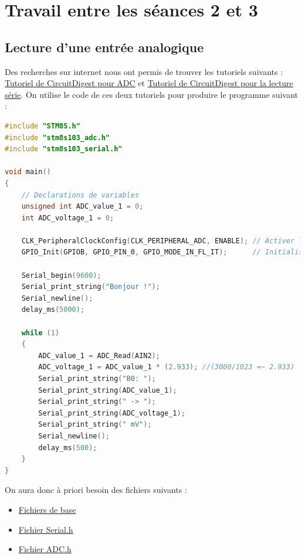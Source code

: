 \documentclass[11pt,a4paper]{article}
\begin{document}
\section{Travail entre les séances 2 et 3}
\subsection{Lecture d'une entrée analogique}
Des recherches sur internet nous ont permis de trouver les tutoriels suivants : \href{https://circuitdigest.com/microcontroller-projects/adc-on-stm8s-using-c-compiler-reading-multiple-adc-values-and-displaying-on-lcd}{Tutoriel de CircuitDigest pour ADC} et \href{https://circuitdigest.com/microcontroller-projects/serial-monitor-on-stm8s-using-cosmic-and-stvd}{Tutoriel de CircuitDigest pour la lecture série}. On utilise le code de ces deux tutoriels pour produire le programme suivant :

\begin{lstlisting}[language=C]
#include "STM8S.h"
#include "stm8s103_adc.h"
#include "stm8s103_serial.h"

void main()
{
    // Declarations de variables
    unsigned int ADC_value_1 = 0;
    int ADC_voltage_1 = 0;

    CLK_PeripheralClockConfig(CLK_PERIPHERAL_ADC, ENABLE); // Activer l'horloge peripherique pour l'ADC
    GPIO_Init(GPIOB, GPIO_PIN_0, GPIO_MODE_IN_FL_IT);      // Initialiser le pin PB0 en entree

    Serial_begin(9600);
    Serial_print_string("Bonjour !");
    Serial_newline();
    delay_ms(5000);

    while (1)
    {
        ADC_value_1 = ADC_Read(AIN2);
        ADC_voltage_1 = ADC_value_1 * (2.933); //(3000/1023 =~ 2.933) 
        Serial_print_string("B0: ");
        Serial_print_string(ADC_value_1);
        Serial_print_string(" -> ");
        Serial_print_string(ADC_voltage_1);
        Serial_print_string(" mV");
        Serial_newline();
        delay_ms(500);
    }
}
\end{lstlisting}

On aura donc à priori besoin des fichiers suivants :
\begin{itemize}
\item \href{https://github.com/CircuitDigest/STM8S103F3_SPL}{Fichiers de base} 
\item \href{https://github.com/CircuitDigest/STM8S103F3_SPL/blob/master/stm8s103%20Libraries/stm8s103_Serial.h}{Fichier Serial.h}
\item \href{https://github.com/CircuitDigest/STM8S103F3_SPL/blob/master/inc/stm8s103_ADC.h}{Fichier ADC.h}
\end{itemize}
\end{document}
